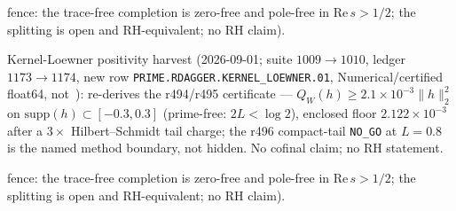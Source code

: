 fence: the trace-free completion is zero-free and pole-free in $\mathrm{Re}\,s>1/2$; the splitting is open and RH-equivalent; no RH claim).

Kernel-Loewner positivity harvest (2026-09-01; suite $1009\to1010$, ledger $1173\to1174$,
new row \texttt{PRIME.RDAGGER.KERNEL\_LOEWNER.01}, Numerical/certified float64, not~\mE):
re-derives the r494/r495 certificate --- $Q_W(h)\ge 2.1{\times}10^{-3}\|h\|_2^2$ on
$\mathrm{supp}(h)\subset[-0.3,0.3]$ (prime-free: $2L<\log 2$), enclosed floor
$2.122{\times}10^{-3}$ after a $3\times$ Hilbert--Schmidt tail charge; the r496
compact-tail \texttt{NO\_GO} at $L=0.8$ is the named method boundary, not hidden.
No cofinal claim; no RH statement.


fence: the trace-free completion is zero-free and pole-free in $\mathrm{Re}\,s>1/2$; the splitting is open and RH-equivalent; no RH claim).

